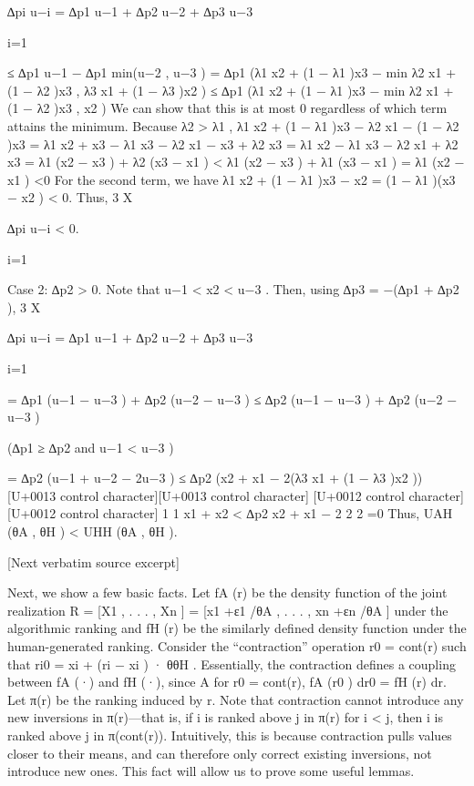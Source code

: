 \documentclass[10pt]{article}
\begin{document}
\begin{ReviewVerbatim}
∆pi u−i = ∆p1 u−1 + ∆p2 u−2 + ∆p3 u−3

i=1

≤ ∆p1 u−1 − ∆p1 min(u−2 , u−3 )
= ∆p1 (λ1 x2 + (1 − λ1 )x3 − min {λ2 x1 + (1 − λ2 )x3 , λ3 x1 + (1 − λ3 )x2 })
≤ ∆p1 (λ1 x2 + (1 − λ1 )x3 − min {λ2 x1 + (1 − λ2 )x3 , x2 })
We can show that this is at most 0 regardless of which term attains the minimum. Because λ2 > λ1 ,
λ1 x2 + (1 − λ1 )x3 − λ2 x1 − (1 − λ2 )x3 = λ1 x2 + x3 − λ1 x3 − λ2 x1 − x3 + λ2 x3
= λ1 x2 − λ1 x3 − λ2 x1 + λ2 x3
= λ1 (x2 − x3 ) + λ2 (x3 − x1 )
< λ1 (x2 − x3 ) + λ1 (x3 − x1 )
= λ1 (x2 − x1 )
<0
For the second term, we have
λ1 x2 + (1 − λ1 )x3 − x2 = (1 − λ1 )(x3 − x2 ) < 0.
Thus,
3
X

∆pi u−i < 0.

i=1

Case 2: ∆p2 > 0. Note that u−1 < x2 < u−3 . Then, using ∆p3 = −(∆p1 + ∆p2 ),
3
X

∆pi u−i = ∆p1 u−1 + ∆p2 u−2 + ∆p3 u−3

i=1

= ∆p1 (u−1 − u−3 ) + ∆p2 (u−2 − u−3 )
≤ ∆p2 (u−1 − u−3 ) + ∆p2 (u−2 − u−3 )

(∆p1 ≥ ∆p2 and u−1 < u−3 )

= ∆p2 (u−1 + u−2 − 2u−3 )
≤ ∆p2 (x2 + x1 − 2(λ3 x1 + (1 − λ3 )x2 ))
[U+0013 control character][U+0013 control character]
[U+0012 control character]
[U+0012 control character]
1
1
x1 + x2
< ∆p2 x2 + x1 − 2
2
2
=0
Thus, UAH (θA , θH ) < UHH (θA , θH ).

[Next verbatim source excerpt]

Next, we show a few basic facts. Let fA (r) be the density function of the joint realization R =
[X1 , . . . , Xn ] = [x1 +ε1 /θA , . . . , xn +εn /θA ] under the algorithmic ranking and fH (r) be the similarly defined
density function under the human-generated ranking. Consider the “contraction” operation r0 = cont(r) such
that ri0 = xi + (ri − xi ) · θθH
. Essentially, the contraction defines a coupling between fA (·) and fH (·), since
A
for r0 = cont(r), fA (r0 ) dr0 = fH (r) dr. Let π(r) be the ranking induced by r. Note that contraction cannot
introduce any new inversions in π(r)—that is, if i is ranked above j in π(r) for i < j, then i is ranked above
j in π(cont(r)). Intuitively, this is because contraction pulls values closer to their means, and can therefore
only correct existing inversions, not introduce new ones. This fact will allow us to prove some useful lemmas.
\end{ReviewVerbatim}
\end{document}
